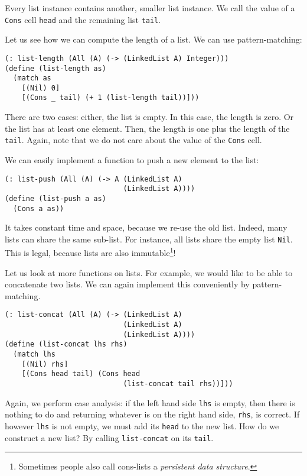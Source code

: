 \documentclass{article}
\begin{document}
Every list instance contains another, smaller list instance. We call the value of a \lstinline{Cons} cell \lstinline{head} and the remaining list \lstinline{tail}.

Let us see how we can compute the length of a list. We can use pattern-matching:

\begin{lstlisting}
(: list-length (All (A) (-> (LinkedList A) Integer)))
(define (list-length as)
  (match as
    [(Nil) 0]
    [(Cons _ tail) (+ 1 (list-length tail))]))
\end{lstlisting}

There are two cases: either, the list is empty. In this case, the length is zero. Or the list has at least one element. Then, the length is one plus the length of the \lstinline{tail}. Again, note that we do not care about the value of the \lstinline{Cons} cell.

We can easily implement a function to push a new element to the list:

\begin{lstlisting}
(: list-push (All (A) (-> A (LinkedList A)
                            (LinkedList A))))
(define (list-push a as)
  (Cons a as))
\end{lstlisting}

It takes constant time and space, because we re-use the old list. Indeed, many lists can share the same sub-list. For instance, all lists share the empty list \lstinline{Nil}. This is legal, because lists are also immutable\footnote{Sometimes people also call cons-lists a \emph{persistent data structure}.}!

Let us look at more functions on lists. For example, we would like to be able to concatenate two lists. We can again implement this conveniently by pattern-matching.

\begin{lstlisting}
(: list-concat (All (A) (-> (LinkedList A)
                            (LinkedList A)
                            (LinkedList A))))
(define (list-concat lhs rhs)
  (match lhs
    [(Nil) rhs]
    [(Cons head tail) (Cons head
                            (list-concat tail rhs))]))
\end{lstlisting}

Again, we perform case analysis: if the left hand side \lstinline{lhs} is empty, then there is nothing to do and returning whatever is on the right hand side, \lstinline{rhs}, is correct. If however \lstinline{lhs} is not empty, we must add its \lstinline{head} to the new list. How do we construct a new list? By calling \lstinline{list-concat} on its \lstinline{tail}.
\end{document}
